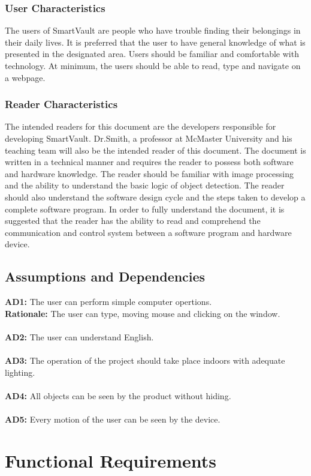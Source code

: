 \documentclass[12pt]{article}
\begin{document}
\subsubsection{User Characteristics}
The users of SmartVault are people who have trouble finding their belongings in their daily lives. It is preferred that the user to have general knowledge of what is presented in the designated area. Users should be familiar and comfortable with technology. At minimum, the users should be able to read, type and navigate on a webpage. 
\subsubsection{Reader Characteristics}
The intended readers for this document are the developers responsible for developing SmartVault. Dr.Smith, a professor at McMaster University and his teaching team will also be the intended reader of this document. The document is written in a technical manner and requires the reader to possess both software and hardware knowledge. The reader should be familiar with image processing and the ability to understand the basic logic of object detection. The reader should also understand the software design cycle and the steps taken to develop a complete software program. In order to fully understand the document, it is suggested that the reader has the ability to read and comprehend the communication and control system between a software program and hardware device. 
\subsection{Assumptions and Dependencies}
\textbf{AD1:} The user can perform simple computer opertions.\\
\textbf{Rationale:} The user can type, moving mouse and clicking on the window.\\\\
\textbf{AD2:} The user can understand English.\\\\
\textbf{AD3:} The operation of the project should take place indoors with adequate lighting.\\\\
\textbf{AD4:} All objects can be seen by the product without hiding.\\\\
\textbf{AD5:} Every motion of the user can be seen by the device. 
\section{Functional Requirements}
\end{document}
